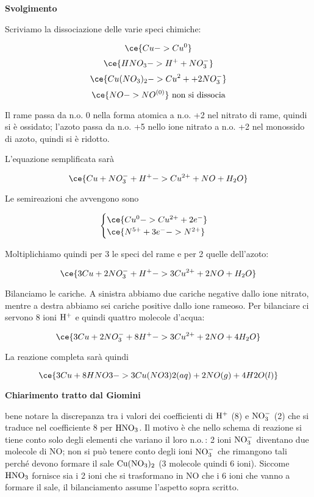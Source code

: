 \large\textbf{Svolgimento}\normalsize

\vspace{0.2cm}Scriviamo la dissociazione delle varie speci chimiche:

$$\ce{Cu -> Cu^0}$$
$$\ce{HNO_3 -> H^+ + NO_3^-}$$
$$\ce{Cu(NO_3)_2 -> Cu^2+ + 2NO_3^-}$$
$$\ce{NO -> NO^{(0)}} \text{ non si dissocia}$$

Il rame passa da n.o. 0 nella forma atomica a n.o. +2 nel nitrato di rame, quindi si è ossidato; l'azoto passa da n.o. +5 nello ione nitrato a n.o. +2 nel monossido di azoto, quindi si è ridotto.

L'equazione semplificata sarà

$$\ce{Cu + NO_3^- + H^+ -> Cu^{2+} + NO + H_2O}$$

Le semireazioni che avvengono sono

$$\begin{cases}
    \ce{Cu^0 -> Cu^{2+} + 2e^-}\\
    \ce{N^{5+} + 3e^- -> N^{2+}}
\end{cases}$$

Moltiplichiamo quindi per 3 le speci del rame e per 2 quelle dell'azoto:

$$\ce{3Cu + 2NO_3^- + H^+ -> 3Cu^{2+} + 2NO + H_2O}$$

Bilanciamo le cariche. A sinistra abbiamo due cariche negative dallo ione nitrato, mentre a destra abbiamo sei cariche positive dallo ione rameoso. Per bilanciare ci servono 8 ioni $\rm H^+$ e quindi quattro molecole d'acqua:

$$\ce{3Cu + 2NO_3^- + 8H^+ -> 3Cu^{2+} + 2NO + 4H_2O}$$

La reazione completa sarà quindi

$$\ce{3Cu + 8HNO3 -> 3Cu(NO3)2(aq) + 2NO(g) + 4H2O(l)}$$

\textbf{Chiarimento tratto dal Giomini}

\E bene notare la discrepanza tra i valori dei coefficienti di $\rm H^+$ (8) e $\rm NO_3^-$ (2) che si traduce nel coefficiente 8 per $\rm HNO_3$. Il motivo è che nello schema di reazione si tiene conto solo degli elementi che variano il loro n.o.\,: 2 ioni $\rm NO_3^-$ diventano due molecole di NO; non si può tenere conto degli ioni $\rm NO_3^-$ che rimangono tali perché devono formare il sale $\rm Cu(NO_3)_2$ (3 molecole quindi 6 ioni). Siccome $\rm HNO_3$ fornisce sia i 2 ioni che si trasformano in NO che i 6 ioni che vanno a formare il sale, il bilanciamento assume l'aspetto sopra scritto.

